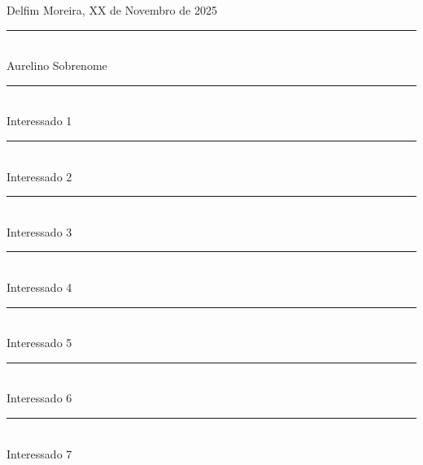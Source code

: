 \documentclass[12pt]{article}
\begin{document}



\vspace{2em}

\begin{flushright}
Delfim Moreira, XX de Novembro de 2025\vspace{2em}
\rule{10cm}{0.5pt}\\Aurelino Sobrenome\\[2em]
\rule{10cm}{0.5pt}\\Interessado 1\\[2em]
\rule{10cm}{0.5pt}\\Interessado 2\\[2em]
\rule{10cm}{0.5pt}\\Interessado 3\\[2em]
\rule{10cm}{0.5pt}\\Interessado 4\\[2em]
\rule{10cm}{0.5pt}\\Interessado 5\\[2em]
\rule{10cm}{0.5pt}\\Interessado 6\\[2em]
\rule{10cm}{0.5pt}\\Interessado 7\\[2em]
\end{flushright}
\end{document}
